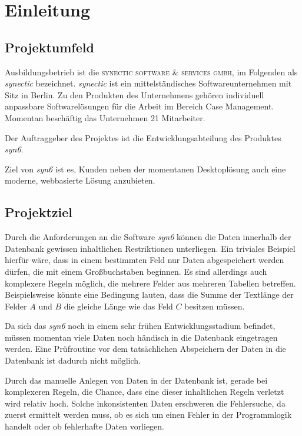 \section{Einleitung}
\label{sec:Einleitung}


\subsection{Projektumfeld} 
\label{sec:Projektumfeld}

Ausbildungsbetrieb ist die \textsc{synectic software \& services gmbh}, im Folgenden als \textit{synectic} bezeichnet. \textit{synectic} ist ein mittelständisches Softwareunternehmen mit Sitz in Berlin. Zu den Produkten des Unternehmens gehören individuell anpassbare Softwarelösungen für die Arbeit im Bereich Case Management. Momentan beschäftig das Unternehmen 21 Mitarbeiter.

Der Auftraggeber des Projektes ist die Entwicklungsabteilung des Produktes \textit{syn6}. 

Ziel von \textit{syn6} ist es, Kunden neben der momentanen Desktoplösung auch eine moderne, webbasierte Lösung anzubieten.


\subsection{Projektziel} 
\label{sec:Projektziel}
Durch die Anforderungen an die Software \textit{syn6} können die Daten innerhalb der Datenbank gewissen inhaltlichen Restriktionen unterliegen. Ein triviales Beispiel hierfür wäre, dass in einem bestimmten Feld nur Daten abgespeichert werden dürfen, die mit einem Großbuchstaben beginnen. Es sind allerdings auch komplexere Regeln möglich, die mehrere Felder aus mehreren Tabellen betreffen. Beispielsweise könnte eine Bedingung lauten, dass die Summe der Textlänge der Felder $A$ und $B$ die gleiche Länge wie das Feld $C$ besitzen müssen.

Da sich das \textit{syn6} noch in einem sehr frühen Entwicklungsstadium befindet, müssen momentan viele Daten noch händisch in die Datenbank eingetragen werden. Eine Prüfroutine vor dem tatsächlichen Abspeichern der Daten in die Datenbank ist dadurch nicht möglich.

Durch das manuelle Anlegen von Daten in der Datenbank ist, gerade bei komplexeren Regeln, die Chance, dass eine dieser inhaltlichen Regeln verletzt wird relativ hoch. Solche inkonsistenten Daten erschweren die Fehlersuche, da zuerst ermittelt werden muss, ob es sich um einen Fehler in der Programmlogik handelt oder ob fehlerhafte Daten vorliegen.

